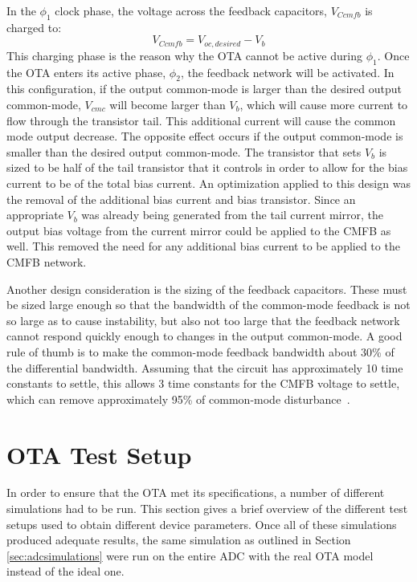 In the $\phi_{1}$ clock phase, the voltage across the feedback capacitors, $V_{Ccmfb}$ is charged to:
\begin{equation}
V_{Ccmfb} = V_{oc,desired} - V_{b}
\end{equation}
This charging phase is the reason why the OTA cannot be active during $\phi_{1}$. Once the OTA enters its active phase, $\phi_{2}$, the feedback network will be activated. In this configuration, if the output common-mode is larger than the desired output common-mode, $V_{cmc}$ will become larger than $V_{b}$, which will cause more current to flow through the transistor tail. This additional current will cause the common mode output decrease. The opposite effect occurs if the output common-mode is smaller than the desired output common-mode. The transistor that sets $V_{b}$ is sized to be half of the tail transistor that it controls in order to allow for the bias current to be  of the total bias current. An optimization applied to this design was the removal of the additional bias current and bias transistor. Since an appropriate $V_{b}$ was already being generated from the tail current mirror, the output bias voltage from the current mirror could be applied to the CMFB as well. This removed the need for any additional bias current to be applied to the CMFB network. 

Another design consideration is the sizing of the feedback capacitors. These must be sized large enough so that the bandwidth of the common-mode feedback is not so large as to cause instability, but also not too large that the feedback network cannot respond quickly enough to changes in the output common-mode. A good rule of thumb is to make the common-mode feedback bandwidth about 30\% of the differential bandwidth. Assuming that the circuit has approximately 10 time constants to settle, this allows 3 time constants for the CMFB voltage to settle, which can remove approximately 95\% of common-mode disturbance~\cite{315areader}.
\section{OTA Test Setup}
\label{sec:otatests}
In order to ensure that the OTA met its specifications, a number of different simulations had to be run. This section gives a brief overview of the different test setups used to obtain different device parameters. Once all of these simulations produced adequate results, the same simulation as outlined in Section \ref{sec:adcsimulations} were run on the entire ADC with the real OTA model instead of the ideal one.

